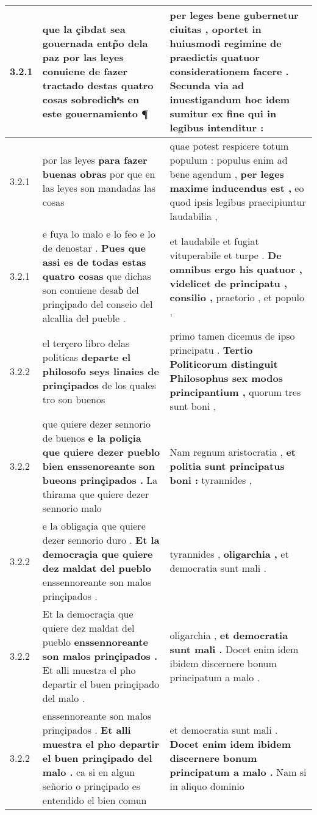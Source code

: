 \begin{tabular}{|p{1cm}|p{6.5cm}|p{6.5cm}|}
3.2.1 & que la çibdat sea gouernada entp̃o dela paz \textbf{ por las leyes conuiene de fazer tractado destas quatro cosas } sobredichͣs en este gouernamiento ¶ & per leges bene gubernetur ciuitas , \textbf{ oportet in huiusmodi regimine de praedictis quatuor considerationem facere . } Secunda via ad inuestigandum hoc idem sumitur ex fine qui in legibus intenditur : \\\hline
3.2.1 & por las leyes \textbf{ para fazer buenas obras } por que en las leyes son mandadas las cosas & quae potest respicere totum populum : populus enim ad bene agendum , \textbf{ per leges maxime inducendus est , } eo quod ipsis legibus praecipiuntur laudabilia , \\\hline
3.2.1 & e fuya lo malo e lo feo e lo de denostar . \textbf{ Pues que assi es de todas estas quatro cosas } que dichas son conuiene desaƀ del prinçipado del conseio del alcalłia del pueble . & et laudabile et fugiat vituperabile et turpe . \textbf{ De omnibus ergo his quatuor , videlicet de principatu , consilio , } praetorio , et populo , \\\hline
3.2.2 & el terçero libro delas politicas \textbf{ departe el philosofo seys linaies de prinçipados } de los quales tro son buenos & primo tamen dicemus de ipso principatu . \textbf{ Tertio Politicorum distinguit Philosophus sex modos principantium , } quorum tres sunt boni , \\\hline
3.2.2 & que quiere dezer sennorio de buenos \textbf{ e la poliçia que quiere dezer pueblo bien enssenoreante son bueons prinçipados . } La thirama que quiere dezer sennorio malo & Nam regnum aristocratia , \textbf{ et politia sunt principatus boni : } tyrannides , \\\hline
3.2.2 & e la obligaçia que quiere dezer sennorio duro . \textbf{ Et la democraçia que quiere dez maldat del pueblo } enssennoreante son malos prinçipados . & tyrannides , \textbf{ oligarchia , } et democratia sunt mali . \\\hline
3.2.2 & Et la democraçia que quiere dez maldat del pueblo \textbf{ enssennoreante son malos prinçipados . } Et alli muestra el pho departir el buen prinçipado del malo . & oligarchia , \textbf{ et democratia sunt mali . } Docet enim idem ibidem discernere bonum principatum a malo . \\\hline
3.2.2 & enssennoreante son malos prinçipados . \textbf{ Et alli muestra el pho departir el buen prinçipado del malo . } ca si en algun señorio o prinçipado es entendido el bien comun & et democratia sunt mali . \textbf{ Docet enim idem ibidem discernere bonum principatum a malo . } Nam si in aliquo dominio \\\hline

\end{tabular}
